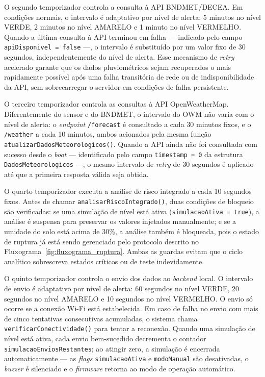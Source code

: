O segundo temporizador controla a consulta à API BNDMET/DECEA.
Em condições normais, o intervalo é adaptativo por nível de alerta:
5 minutos no nível VERDE, 2 minutos no nível AMARELO e 1 minuto
no nível VERMELHO. Quando a última consulta à API terminou em
falha — indicado pelo campo \texttt{apiDisponivel = false} —, o
intervalo é substituído por um valor fixo de 30 segundos,
independentemente do nível de alerta. Esse mecanismo de
\textit{retry} acelerado garante que os dados pluviométricos
sejam recuperados o mais rapidamente possível após uma falha
transitória de rede ou de indisponibilidade da API, sem
sobrecarregar o servidor em condições de falha persistente.

O terceiro temporizador controla as consultas à API OpenWeatherMap.
Diferentemente do sensor e do BNDMET, o intervalo do OWM não varia
com o nível de alerta: o \textit{endpoint} \texttt{/forecast} é
consultado a cada 30 minutos fixos, e o \texttt{/weather} a cada
10 minutos, ambos acionados pela mesma função
\texttt{atualizarDadosMeteorologicos()}. Quando a API ainda não foi
consultada com sucesso desde o \textit{boot} — identificado pelo
campo \texttt{timestamp = 0} da estrutura \texttt{DadosMeteorologicos}
—, o mesmo intervalo de \textit{retry} de 30 segundos é aplicado
até que a primeira resposta válida seja obtida.

O quarto temporizador executa a análise de risco integrado a cada
10 segundos fixos. Antes de chamar \texttt{analisarRiscoIntegrado()},
duas condições de bloqueio são verificadas: se uma simulação de nível
está ativa (\texttt{simulacaoAtiva = true}), a análise é suspensa
para preservar os valores injetados manualmente; e se a umidade do
solo está acima de 30\%, a análise também é bloqueada, pois o
estado de ruptura já está sendo gerenciado pelo protocolo descrito
no Fluxograma~\ref{fig:fluxograma_ruptura}. Ambas as guardas evitam
que o ciclo analítico sobrescreva estados críticos ou de teste
indevidamente.

O quinto temporizador controla o envio dos dados ao
\textit{backend} local. O intervalo de envio é adaptativo por nível
de alerta: 60 segundos no nível VERDE, 20 segundos no nível
AMARELO e 10 segundos no nível VERMELHO. O envio só ocorre se a
conexão Wi-Fi está estabelecida. Em caso de falha no envio com mais
de cinco tentativas consecutivas acumuladas, o sistema chama
\texttt{verificarConectividade()} para tentar a reconexão. Quando
uma simulação de nível está ativa, cada envio bem-sucedido decrementa
o contador \texttt{simulacaoEnviosRestantes}; ao atingir zero, a
simulação é encerrada automaticamente — as \textit{flags}
\texttt{simulacaoAtiva} e \texttt{modoManual} são desativadas, o
\textit{buzzer} é silenciado e o \textit{firmware} retorna ao
modo de operação automático.

